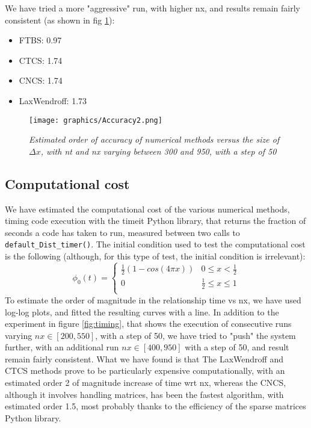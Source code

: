 We have tried a more "aggressive" run, with higher nx, and results remain fairly consistent (as shown in fig \ref{fig:orderofacc2}):
\begin{itemize}
	\item FTBS: 0.97
	\item CTCS: 1.74
	\item CNCS: 1.74
	\item LaxWendroff: 1.73
\end{itemize}

\begin{figure}[H]
	\begin{center}
		\texttt{[image: graphics/Accuracy2.png]}
	\end{center}%
	\caption[Order of accuracy of numerical methods]{ \em Estimated order of accuracy of numerical methods versus the size of $\Delta x$, with nt and nx varying between 300 and 950, with a step of 50}
	\label{fig:orderofacc2}
\end{figure}

\subsection{Computational cost}
\label{sec:compcost}
We have estimated the computational cost of the various numerical methods, timing code execution with the timeit Python library, that returns the fraction of seconds a code has taken to run, measured between two calls to \texttt{default\_Dist\_timer()}.
The initial condition used to test the computational cost is the following (although, for this type of test, the initial condition is irrelevant):
\begin{equation}
\phi_0(t)=\left\{
\begin{array}{lr}
\frac{1}{2}(1-cos(4\pi x)) & 0\leq x<\frac{1}{2} \\
0 &  \frac{1}{2}\leq x\leq 1 \\
\end{array}
\right.
\label{eq:initcondcos}
\end{equation}
To estimate the order of magnitude in the relationship time vs nx, we have used log-log plots, and fitted the resulting curves with a line. In addition to the experiment in figure \ref{fig:timing}, that shows the execution of consecutive runs varying $nx\in [200, 550]$, with a step of 50, we have tried to "push" the system further, with an additional run $nx\in [400, 950]$ with a step of 50, and result remain fairly consistent.
What we have found is that The LaxWendroff and CTCS methods prove to be particularly expensive computationally, with an estimated order 2 of magnitude increase of time wrt nx, whereas the CNCS, although it involves handling matrices, has been the fastest algorithm, with estimated order 1.5, most probably thanks to the efficiency of the sparse matrices Python library.

